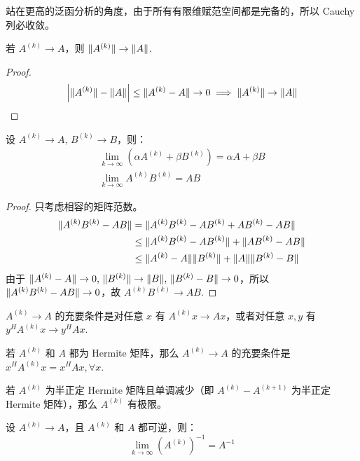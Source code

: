 \begin{remark}
站在更高的泛函分析的角度，由于所有有限维赋范空间都是完备的，所以 Cauchy 列必收敛。
\end{remark}

\begin{property}
若 $A^{(k)}\to A$，则 $\Vert A^{(k)}\Vert\to\Vert A\Vert$.
\end{property}
\begin{proof}
\[
    \left|\Vert A^{(k)}\Vert-\Vert A\Vert\right|\leq\Vert A^{(k)}-A\Vert\to0\implies\Vert A^{(k)}\Vert\to\Vert A\Vert
\]
\end{proof}

\begin{property}
设 $A^{(k)}\to A,\,B^{(k)}\to B$，则：
\begin{gather*}
    \lim_{k\to\infty}\left(\alpha A^{(k)}+\beta B^{(k)}\right)=\alpha A+\beta B\\
    \lim_{k\to\infty}A^{(k)}B^{(k)}=AB
\end{gather*}
\end{property}
\begin{proof}
只考虑相容的矩阵范数。
\begin{align*}
    \Vert A^{(k)}B^{(k)}-AB\Vert&=\Vert A^{(k)}B^{(k)}-AB^{(k)}+AB^{(k)}-AB\Vert\\
    &\leq\Vert A^{(k)}B^{(k)}-AB^{(k)}\Vert+\Vert AB^{(k)}-AB\Vert\\
    &\leq\Vert A^{(k)}-A\Vert\Vert B^{(k)}\Vert+\Vert A\Vert\Vert B^{(k)}-B\Vert
\end{align*}
由于 $\Vert A^{(k)}-A\Vert\to0,\,\Vert B^{(k)}\Vert\to\Vert B\Vert,\,\Vert B^{(k)}-B\Vert\to0$，所以 $\Vert A^{(k)}B^{(k)}-AB\Vert\to0$，故 $A^{(k)}B^{(k)}\to AB$.
\end{proof}

\begin{theorem}
$A^{(k)}\to A$ 的充要条件是对任意 $x$ 有 $A^{(k)}x\to Ax$，或者对任意 $x,y$ 有 $y^HA^{(k)}x\to y^HAx$.
\end{theorem}

\begin{theorem}
若 $A^{(k)}$ 和 $A$ 都为 Hermite 矩阵，那么 $A^{(k)}\to A$ 的充要条件是 $x^HA^{(k)}x=x^HAx,\forall x$.
\end{theorem}

\begin{corollary}[类比单调有界定理]
若 $A^{(k)}$ 为半正定 Hermite 矩阵且单调减少（即 $A^{(k)}-A^{(k+1)}$ 为半正定 Hermite 矩阵），那么 $A^{(k)}$ 有极限。
\end{corollary}

\begin{property}
设 $A^{(k)}\to A$，且 $A^{(k)}$ 和 $A$ 都可逆，则：
\[
    \lim_{k\to\infty}\left(A^{(k)}\right)^{-1}=A^{-1}
\]
\end{property}

